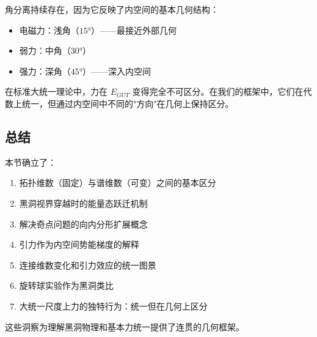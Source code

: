 角分离持续存在，因为它反映了内空间的基本几何结构：
\begin{itemize}
    \item 电磁力：浅角（$15°$）——最接近外部几何
    \item 弱力：中角（$30°$）
    \item 强力：深角（$45°$）——深入内空间
\end{itemize}

\begin{remark}[与标准大统一理论的对比]
在标准大统一理论中，力在 $E_{GUT}$ 变得完全不可区分。在我们的框架中，它们在代数上统一，但通过内空间中不同的"方向"在几何上保持区分。
\end{remark}

\subsection{总结}

本节确立了：
\begin{enumerate}
    \item 拓扑维数（固定）与谱维数（可变）之间的基本区分
    \item 黑洞视界穿越时的能量态跃迁机制
    \item 解决奇点问题的向内分形扩展概念
    \item 引力作为内空间势能梯度的解释
    \item 连接维数变化和引力效应的统一图景
    \item 旋转球实验作为黑洞类比
    \item 大统一尺度上力的独特行为：统一但在几何上区分
\end{enumerate}

这些洞察为理解黑洞物理和基本力统一提供了连贯的几何框架。
